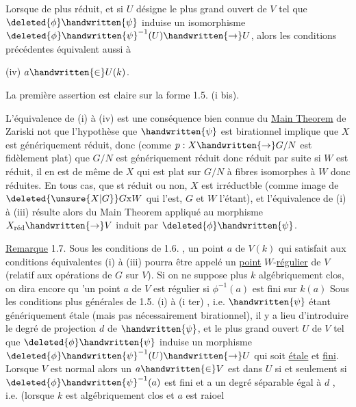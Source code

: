 Lorsque  de plus  réduit, et si $U$ désigne le plus grand ouvert de $V$ tel que $\deleted{\phi}\handwritten{\psi}$ induise un isomorphisme $\deleted{\phi}\handwritten{\psi}^{-1}(U)\handwritten{\to}U$, alors les conditions précédentes équivalent aussi à

(iv) $a\handwritten{\in}U(k)$.

La première assertion est claire sur la forme 1.5. (i bis).

L'équivalence de (i) à (iv) est une conséquence bien connue du \uline{Main Theorem} de Zariski  not que  l'hypothèse que $\handwritten{\psi}$ est birationnel implique que  $X$ est génériquement réduit, donc (comme $p:X\handwritten{\to}G/N$ est fidèlement plat) que $G/N$ est génériquement réduit donc réduit\handwritten{;} par suite si $W$ est réduit, il en est de même de $X$ qui est  plat sur $G/N$ à fibres  isomorphes à $W$ donc réduites. En tous cas, que  st réduit ou non, $X$ est irréductble (comme image de $\deleted{\unsure{X|G}}G\mathrm{x}W$ qui l'est, $G$ et $W$ l'étant), et l'équivalence de (i) à (iii) résulte alors du Main Theorem appliqué au morphisme $X_{\text{réd}}\handwritten{\to}V$ induit par $\deleted{\phi}\handwritten{\psi}$.

\uline{Remarque} 1.7. Sous les conditions de 1.6. , un point $a$ de $V(k)$ qui satisfait aux conditions équivalentes (i) à (iii) pourra être appelé un \uline{point}  $W$-\uline{régulier} de $V$ (relatif aux opérations de $G$ sur $V$).  Si on ne suppose plus $k$ algébriquement clos, on dira encore qu 'un point $a$ de $V$ est régulier si $\phi^{-1}(a)$ est  fini sur $k(a)$  Sous les conditions plus générales de 1.5. (i) à (i ter) , i.e. $\handwritten{\psi}$ étant génériquement étale (mais pas nécessairement birationnel), il y a lieu d'introduire le degré de projection $d$ de $\handwritten{\psi}$, et le plus grand ouvert $U$ de $V$ tel que $\deleted{\phi}\handwritten{\psi}$ induise un morphisme $\deleted{\phi}\handwritten{\psi}^{-1}(U)\handwritten{\to}U$ qui soit \uline{étale} et \uline{fini}. Lorsque $V$ est normal\handwritten{,} alors un $a\handwritten{\in}V$ est dans $U$ si et seulement si $\deleted{\phi}\handwritten{\psi}^{-1}(a)$ est fini et a un degré séparable égal à $d$ , i.e. (lorsque $k$ est algébriquement clos et $a$ est raioel
